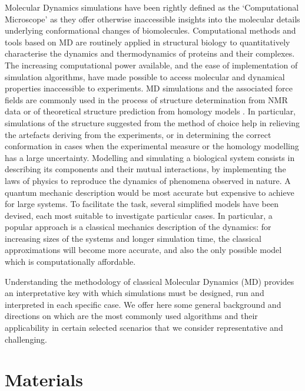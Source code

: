 \documentclass[graybox]{svmult}
\begin{document}
Molecular Dynamics simulations have been rightly defined as the `Computational Microscope' \cite{Lee2009,Dror2012} as they offer otherwise inaccessible insights into the molecular details underlying conformational changes of biomolecules. Computational methods and tools based on MD are routinely applied in structural biology to quantitatively characterise the dynamics and thermodynamics of proteins and their complexes.
The increasing computational power available, and the ease of implementation of simulation algorithms, have made possible to access molecular and dynamical properties inaccessible to experiments.
MD simulations and the associated force fields are commonly used in the process of structure determination from NMR data or of theoretical structure prediction from homology models \cite{Vogel2017,Heo2018}. In particular, simulations of the structure suggested from the method of choice help in relieving the artefacts deriving from the experiments, or in determining the correct conformation in cases when the experimental measure or the homology modelling has a large uncertainty.
%
Modelling and simulating a biological system consists in describing its components and their mutual interactions, by implementing the laws of physics to reproduce the dynamics of phenomena observed in nature. A quantum mechanic description would be most accurate but expensive to achieve for large systems. To facilitate the task, several simplified models have been devised, each most suitable to investigate particular cases.
%
In particular, a popular approach is a classical mechanics description of the dynamics: for increasing sizes of the systems and longer simulation time, the classical approximations will become more accurate, and also the only possible model which is computationally affordable.

Understanding the methodology of classical Molecular Dynamics (MD) provides an interpretative key with which simulations must be designed, run and interpreted in each specific case. We offer here some general background and directions on which are the most commonly used algorithms and their applicability in certain selected scenarios that we consider representative and challenging.


\section{Materials}
\end{document}
